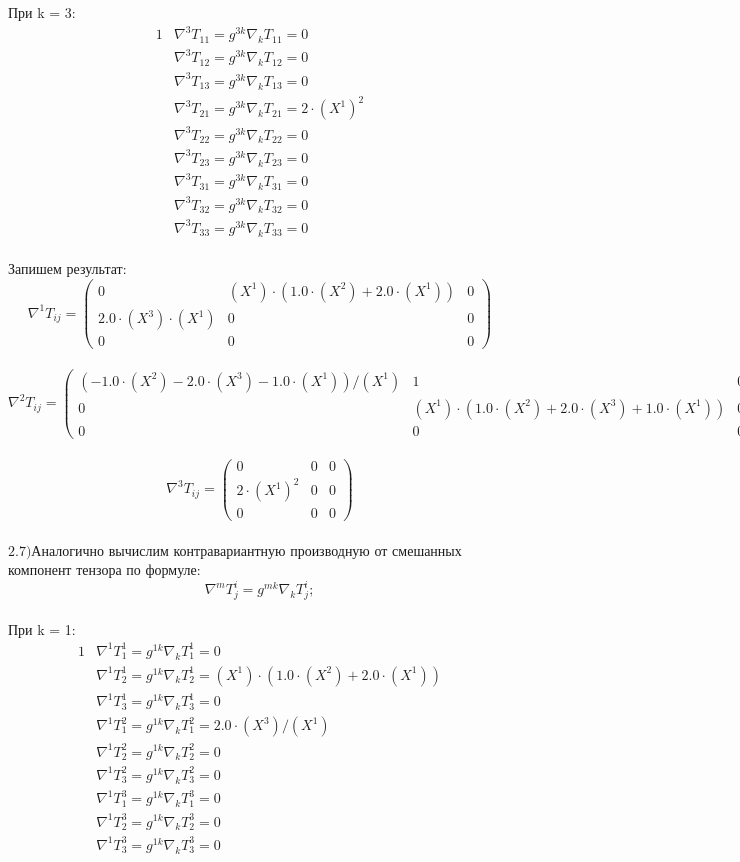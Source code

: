 \documentclass[a4paper, 12pt, oneside]{article}
\begin{document}
При k = 3:\\
\begin{alignat*}{1}
  & \nabla^3T_{11} = g^{3k}\nabla_kT_{11} = 0 \\
  & \nabla^3T_{12} = g^{3k}\nabla_kT_{12} = 0 \\
  & \nabla^3T_{13} = g^{3k}\nabla_kT_{13} = 0 \\
  & \nabla^3T_{21} = g^{3k}\nabla_kT_{21} = 2\cdot (X^1)^2 \\
  & \nabla^3T_{22} = g^{3k}\nabla_kT_{22} = 0 \\
  & \nabla^3T_{23} = g^{3k}\nabla_kT_{23} = 0 \\
  & \nabla^3T_{31} = g^{3k}\nabla_kT_{31} = 0 \\
  & \nabla^3T_{32} = g^{3k}\nabla_kT_{32} = 0 \\
  & \nabla^3T_{33} = g^{3k}\nabla_kT_{33} = 0 
\end{alignat*}\\
Запишем результат:\\
\[
\nabla^1T_{ij} = \begin{pmatrix}
	0 & (X^1)\cdot (1.0\cdot (X^2) + 2.0\cdot (X^1)) & 0\\
	2.0\cdot (X^3)\cdot (X^1) & 0 & 0\\
	0 & 0 & 0
\end{pmatrix}
\]\\
\[
\nabla^2T_{ij} = \begin{pmatrix}
	(-1.0\cdot (X^2) - 2.0\cdot (X^3) - 1.0\cdot (X^1))/(X^1) & 1 & 0\\
	0 & (X^1)\cdot (1.0\cdot (X^2) + 2.0\cdot (X^3) + 1.0\cdot (X^1)) & 0\\
	0 & 0 & 0
\end{pmatrix}
\]\\
\[
\nabla^3T_{ij} = \begin{pmatrix}
	0 & 0 & 0\\
	2\cdot (X^1)^2 & 0 & 0\\
	0 & 0 & 0
\end{pmatrix}
\]\\
$\mathrm{2.7) }$Аналогично вычислим контравариантную производную от смешанных компонент тензора по формуле:\\
\[
\nabla^mT^i_j = g^{mk}\nabla_kT^i_j;
\]\\
При k = 1:\\
\begin{alignat*}{1}
  & \nabla^1T^1_1 = g^{1k}\nabla_kT^1_1 = 0 \\
  & \nabla^1T^1_2 = g^{1k}\nabla_kT^1_2 = (X^1)\cdot (1.0\cdot (X^2) + 2.0\cdot (X^1)) \\
  & \nabla^1T^1_3 = g^{1k}\nabla_kT^1_3 = 0 \\
  & \nabla^1T^2_1 = g^{1k}\nabla_kT^2_1 = 2.0\cdot (X^3)/(X^1) \\
  & \nabla^1T^2_2 = g^{1k}\nabla_kT^2_2 = 0 \\
  & \nabla^1T^2_3 = g^{1k}\nabla_kT^2_3 = 0 \\
  & \nabla^1T^3_1 = g^{1k}\nabla_kT^3_1 = 0 \\
  & \nabla^1T^3_2 = g^{1k}\nabla_kT^3_2 = 0 \\
  & \nabla^1T^3_3 = g^{1k}\nabla_kT^3_3 = 0 
\end{alignat*}\\
\end{document}
